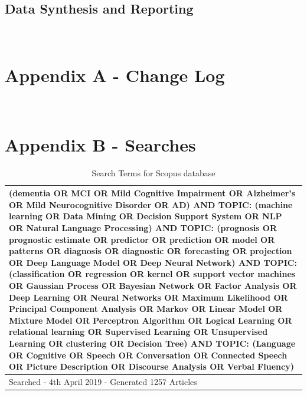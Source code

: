 \documentclass[12pt]{article}
\begin{document}
\subsection{Data Synthesis and Reporting}

\appendix
\section{\\Appendix A - Change Log}

\section{\\Appendix B - Searches}
\begin{table}
	\begin{tabular}{ p{12cm} }
	\hline
	(dementia OR MCI OR Mild Cognitive Impairment OR Alzheimer's OR Mild Neurocognitive Disorder OR AD) AND TOPIC: (machine learning OR Data Mining OR Decision Support System OR NLP OR Natural 			Language Processing) AND TOPIC: (prognosis OR prognostic estimate OR predictor OR prediction OR model OR patterns OR diagnosis OR diagnostic OR forecasting OR projection OR Deep Language Model 		OR Deep Neural Network) AND TOPIC: (classification OR regression OR kernel OR support vector machines OR Gaussian Process OR Bayesian Network OR Factor Analysis OR Deep Learning OR Neural 			Networks OR Maximum Likelihood OR Principal Component Analysis OR Markov OR Linear Model OR Mixture Model OR Perceptron Algorithm OR Logical Learning OR relational learning OR Supervised 				Learning OR Unsupervised Learning OR clustering OR Decision Tree) AND TOPIC: (Language OR Cognitive OR Speech OR Conversation OR Connected Speech OR Picture Description OR Discourse Analysis OR 		Verbal Fluency)  \\ \hline
	Searched - 4th April 2019 - Generated 1257 Articles \\
	\hline
	\end{tabular}
	\caption[Table caption text]{Search Terms for Scopus database}
	\label{table:name}
\end{table}
\end{document}
